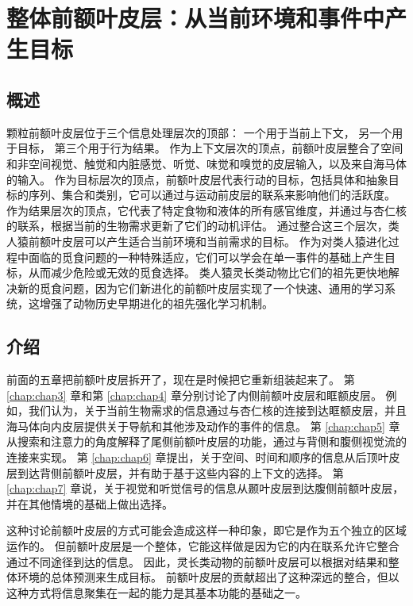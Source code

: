 \chapter{整体前额叶皮层：从当前环境和事件中产生目标} \label{chap:chap8}

\section{概述}

颗粒前额叶皮层位于三个信息处理层次的顶部：
一个用于当前上下文，
另一个用于目标，
第三个用于行为结果。
作为上下文层次的顶点，前额叶皮层整合了空间和非空间视觉、触觉和内脏感觉、听觉、味觉和嗅觉的皮层输入，以及来自海马体的输入。
作为目标层次的顶点，前额叶皮层代表行动的目标，包括具体和抽象目标的序列、集合和类别，它可以通过与运动前皮层的联系来影响他们的活跃度。
作为结果层次的顶点，它代表了特定食物和液体的所有感官维度，并通过与杏仁核的联系，根据当前的生物需求更新了它们的动机评估。
通过整合这三个层次，类人猿前额叶皮层可以产生适合当前环境和当前需求的目标。
作为对类人猿进化过程中面临的觅食问题的一种特殊适应，它们可以学会在单一事件的基础上产生目标，从而减少危险或无效的觅食选择。
类人猿灵长类动物比它们的祖先更快地解决新的觅食问题，因为它们新进化的前额叶皮层实现了一个快速、通用的学习系统，这增强了动物历史早期进化的祖先强化学习机制。



\section{介绍}
\par

前面的五章把前额叶皮层拆开了，现在是时候把它重新组装起来了。
第 \ref{chap:chap3} 章和第 \ref{chap:chap4} 章分别讨论了内侧前额叶皮层和眶额皮层。
例如，我们认为，关于当前生物需求的信息通过与杏仁核的连接到达眶额皮层，并且海马体向内皮层提供关于导航和其他涉及动作的事件的信息。
第 \ref{chap:chap5} 章从搜索和注意力的角度解释了尾侧前额叶皮层的功能，通过与背侧和腹侧视觉流的连接来实现。
第 \ref{chap:chap6} 章提出，关于空间、时间和顺序的信息从后顶叶皮层到达背侧前额叶皮层，并有助于基于这些内容的上下文的选择。
第 \ref{chap:chap7} 章说，关于视觉和听觉信号的信息从颞叶皮层到达腹侧前额叶皮层，并在其他情境的基础上做出选择。
\par


这种讨论前额叶皮层的方式可能会造成这样一种印象，即它是作为五个独立的区域运作的。
但前额叶皮层是一个整体，它能这样做是因为它的内在联系允许它整合通过不同途径到达的信息。
因此，灵长类动物的前额叶皮层可以根据对结果和整体环境的总体预测来生成目标。
前额叶皮层的贡献超出了这种深远的整合，但以这种方式将信息聚集在一起的能力是其基本功能的基础之一。
\par


